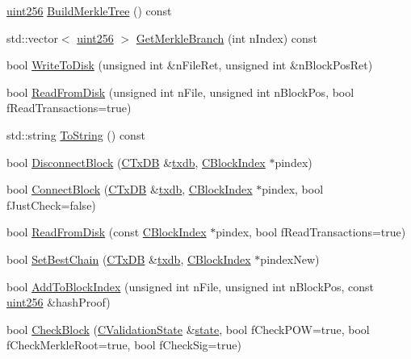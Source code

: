 \begin{DoxyCompactItemize}
\item 
\hyperlink{classuint256}{uint256} \hyperlink{class_c_block_a930d742dbdcd7c78159d3f93431d2d3e}{Build\+Merkle\+Tree} () const 
\item 
std\+::vector$<$ \hyperlink{classuint256}{uint256} $>$ \hyperlink{class_c_block_ad857691c46c20eee278c083f7513d0f6}{Get\+Merkle\+Branch} (int n\+Index) const 
\item 
bool \hyperlink{class_c_block_a606df2cab7dc67e5dd11b157d288cf2b}{Write\+To\+Disk} (unsigned int \&n\+File\+Ret, unsigned int \&n\+Block\+Pos\+Ret)
\item 
bool \hyperlink{class_c_block_a77a1b1e9902e1e557d762f5a5f325cd8}{Read\+From\+Disk} (unsigned int n\+File, unsigned int n\+Block\+Pos, bool f\+Read\+Transactions=true)
\item 
std\+::string \hyperlink{class_c_block_a85d1cca7cd03ad1893767ae8305bd3b5}{To\+String} () const 
\item 
bool \hyperlink{class_c_block_a9532c041d24701a338ea5c91008b72aa}{Disconnect\+Block} (\hyperlink{class_c_tx_d_b}{C\+Tx\+D\+B} \&\hyperlink{txdb-leveldb_8cpp_a72eff8ae1d84de13daf97a61b8c02bc6}{txdb}, \hyperlink{class_c_block_index}{C\+Block\+Index} $\ast$pindex)
\item 
bool \hyperlink{class_c_block_a1ae149d97c7b7eadf48f5cea934b6217}{Connect\+Block} (\hyperlink{class_c_tx_d_b}{C\+Tx\+D\+B} \&\hyperlink{txdb-leveldb_8cpp_a72eff8ae1d84de13daf97a61b8c02bc6}{txdb}, \hyperlink{class_c_block_index}{C\+Block\+Index} $\ast$pindex, bool f\+Just\+Check=false)
\item 
bool \hyperlink{class_c_block_ad31bb55c819816d722ebc0980d85cfc7}{Read\+From\+Disk} (const \hyperlink{class_c_block_index}{C\+Block\+Index} $\ast$pindex, bool f\+Read\+Transactions=true)
\item 
bool \hyperlink{class_c_block_a6e308b2d75d1cfc4a75eda36feb60ca1}{Set\+Best\+Chain} (\hyperlink{class_c_tx_d_b}{C\+Tx\+D\+B} \&\hyperlink{txdb-leveldb_8cpp_a72eff8ae1d84de13daf97a61b8c02bc6}{txdb}, \hyperlink{class_c_block_index}{C\+Block\+Index} $\ast$pindex\+New)
\item 
bool \hyperlink{class_c_block_afab527f890c5575db3b1a2b17f47bf5a}{Add\+To\+Block\+Index} (unsigned int n\+File, unsigned int n\+Block\+Pos, const \hyperlink{classuint256}{uint256} \&hash\+Proof)
\item 
bool \hyperlink{class_c_block_aa735790178f95defd59f984dd51bc0f2}{Check\+Block} (\hyperlink{class_c_validation_state}{C\+Validation\+State} \&\hyperlink{version__set_8cc_a6aad002d0db5e5e85dc31927a5a6f503}{state}, bool f\+Check\+P\+O\+W=true, bool f\+Check\+Merkle\+Root=true, bool f\+Check\+Sig=true)

\end{DoxyCompactItemize}

